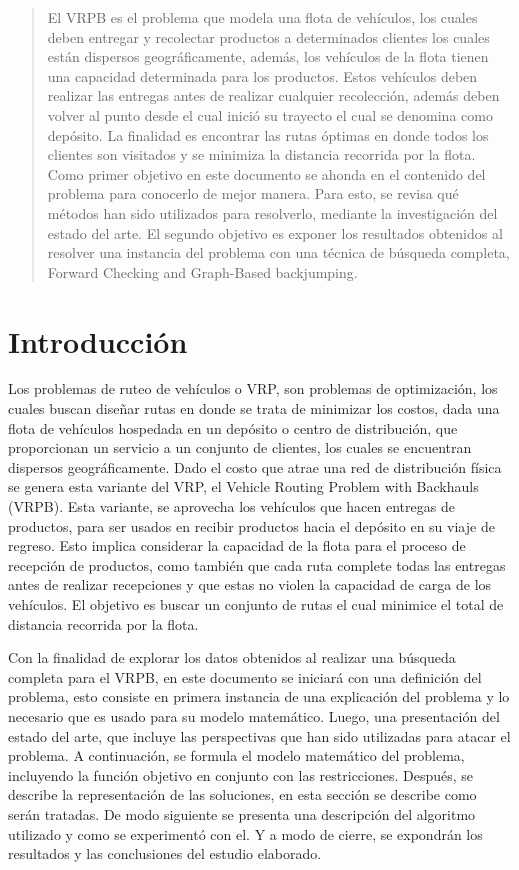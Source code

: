 \documentclass[letter, 10pt]{article}
\begin{document}
\begin{abstract}
El VRPB es el problema que modela una flota de vehículos, los cuales deben entregar y recolectar productos a determinados clientes los cuales están dispersos geográficamente, además, los vehículos de la flota tienen una capacidad determinada para los productos. Estos vehículos deben realizar las entregas antes de realizar cualquier recolección, además deben volver al punto desde el cual inició su trayecto el cual se denomina como depósito. La finalidad es encontrar las rutas óptimas en donde todos los clientes son visitados y se minimiza la distancia recorrida por la flota. Como primer objetivo en este documento se ahonda en el contenido del problema para conocerlo de mejor manera. Para esto, se revisa qué métodos han sido utilizados para resolverlo, mediante la investigación del estado del arte. El segundo objetivo es exponer los resultados obtenidos al resolver una instancia del problema con una técnica de búsqueda completa, Forward Checking and Graph-Based backjumping.
\end{abstract}

\section{Introducción}

Los problemas de ruteo de vehículos o VRP, son problemas de optimización, los cuales buscan diseñar rutas en donde se trata de minimizar los costos, dada una flota de vehículos hospedada en un depósito o centro de distribución, que proporcionan un servicio a un conjunto de clientes, los cuales se encuentran dispersos geográficamente. Dado el costo que atrae una red de distribución física se genera esta variante del VRP, el Vehicle Routing Problem with Backhauls (VRPB). Esta variante, se aprovecha los vehículos que hacen entregas de productos, para ser usados en recibir productos hacia el depósito en su viaje de regreso. Esto implica considerar la capacidad de la flota para el proceso de recepción de productos, como también que cada ruta complete todas las entregas antes de realizar recepciones y que estas no violen la capacidad de carga de los vehículos. El objetivo es buscar un conjunto de rutas el cual minimice el total de distancia recorrida por la flota.
\\\par
Con la finalidad de explorar los datos obtenidos al realizar una búsqueda completa para el VRPB, en este documento se iniciará con una definición del problema, esto consiste en primera instancia de una explicación del problema y lo necesario que es usado para su modelo matemático. Luego, una presentación del estado del arte, que incluye las perspectivas que han sido utilizadas para atacar el problema. A continuación, se formula el modelo matemático del problema, incluyendo la función objetivo en conjunto con las restricciones. Después, se describe la representación de las soluciones, en esta sección se describe como serán tratadas. De modo siguiente se presenta una descripción del algoritmo utilizado y como se experimentó con el. Y a modo de cierre, se expondrán los resultados y las conclusiones del estudio elaborado.
\end{document}
